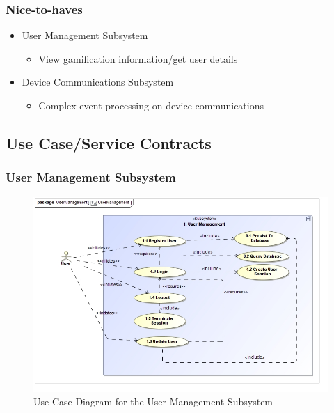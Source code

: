\documentclass{article}
\begin{document}
\subsubsection{Nice-to-haves}
\begin{itemize}
	\item User Management Subsystem
	\begin{itemize}
		\item View gamification information/get user details
	\end{itemize}
	\item Device Communications Subsystem
	\begin{itemize}
		\item Complex event processing on device communications
	\end{itemize}
\end{itemize}

\subsection{Use Case/Service Contracts}

\subsubsection{User Management Subsystem}

	\begin{figure}[H]
		\includegraphics[width=\linewidth]{images/UseCases/UserManagement.jpg}
		\caption{Use Case Diagram for the User Management Subsystem}
	\end{figure}
\end{document}

